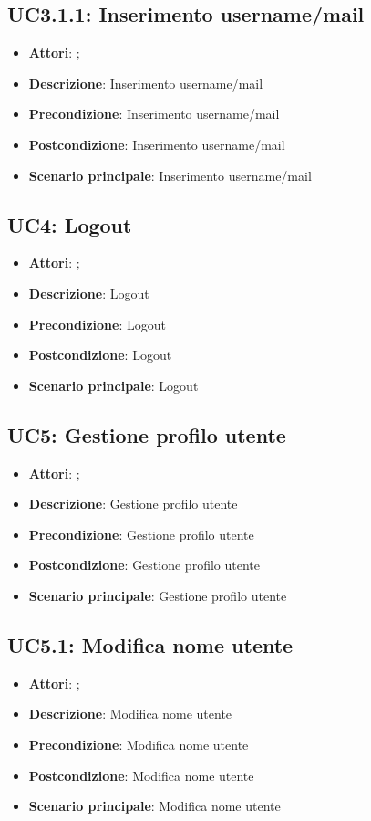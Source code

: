 \subsection{UC3.1.1: Inserimento username/mail}
\label{UC3.1.1}
\begin{itemize}
\item \textbf{Attori}: ;
\item \textbf{Descrizione}: Inserimento username/mail
\item \textbf{Precondizione}: Inserimento username/mail
\item \textbf{Postcondizione}: Inserimento username/mail
\item \textbf{Scenario principale}:
Inserimento username/mail
\end{itemize}

\subsection{UC4: Logout}
\label{UC4}
\begin{itemize}
\item \textbf{Attori}: ;
\item \textbf{Descrizione}: Logout
\item \textbf{Precondizione}: Logout
\item \textbf{Postcondizione}: Logout
\item \textbf{Scenario principale}:
Logout
\end{itemize}

\subsection{UC5: Gestione profilo utente}
\label{UC5}
\begin{itemize}
\item \textbf{Attori}: ;
\item \textbf{Descrizione}: Gestione profilo utente
\item \textbf{Precondizione}: Gestione profilo utente
\item \textbf{Postcondizione}: Gestione profilo utente
\item \textbf{Scenario principale}:
Gestione profilo utente
\end{itemize}

\subsection{UC5.1: Modifica nome utente}
\label{UC5.1}
\begin{itemize}
\item \textbf{Attori}: ;
\item \textbf{Descrizione}: Modifica nome utente
\item \textbf{Precondizione}: Modifica nome utente
\item \textbf{Postcondizione}: Modifica nome utente
\item \textbf{Scenario principale}:
Modifica nome utente
\end{itemize}

